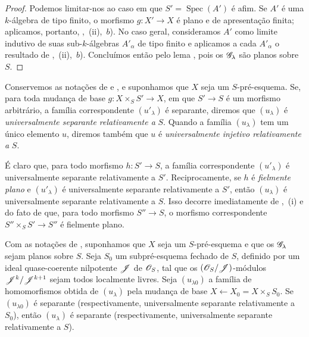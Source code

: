 \begin{proof}
Podemos limitar-nos
ao caso em que
$S'=\operatorname{Spec}(A')$
é afim. Se $A'$ é uma
$k$-álgebra de tipo
finito, o morfismo
$g:X'\to X$ é plano
e de apresentação
finita; aplicamos,
portanto,
,~(ii),~$b$).
No caso geral,
consideramos $A'$
como limite indutivo
de suas sub-$k$-álgebras
$A'_\alpha$ de tipo
finito e aplicamos
a cada $A'_\alpha$
o resultado de
,~(ii),~$b$).
Concluímos então
pelo lema
,
pois os
$\mathscr{G}_\lambda$
são planos sobre $S$.
\end{proof}

\begin{env}[11.9.14]
\label{IV.11.9.14}
Conservemos as
notações de
 e
,
e suponhamos que
$X$ seja um
$S$-pré-esquema.
Se, para toda mudança
de base
$g:X\times_S S'\to X$,
em que $S'\to S$ é
um morfismo
arbitrário, a família
correspondente
$(u'_\lambda)$ é
separante, diremos
que $(u_\lambda)$ é
\emph{universalmente
separante relativamente
a} $S$. Quando a
família $(u_\lambda)$
tem um único elemento
$u$, diremos também
que $u$ é
\emph{universalmente
injetivo relativamente
a} $S$.

É claro que, para
todo morfismo
$h:S'\to S$, a família
correspondente
$(u'_\lambda)$ é
universalmente
separante relativamente
a $S'$. Reciprocamente,
se $h$ é
\emph{fielmente plano}
e $(u'_\lambda)$ é
universalmente
separante relativamente
a $S'$, então
$(u_\lambda)$ é
universalmente
separante relativamente
a $S$. Isso decorre
imediatamente de
,~(i)
e do fato de que,
para todo morfismo
$S''\to S$, o morfismo
correspondente
$S''\times_S S'\to S''$
é fielmente plano.
\end{env}


\begin{proposition}[11.9.15]
\label{IV.11.9.15}
Com as notações de
,
suponhamos que $X$
seja um $S$-pré-esquema
e que os
$\mathscr{G}_\lambda$
sejam planos sobre $S$.
Seja $S_0$ um
subpré-esquema fechado
de $S$, definido por
um ideal quase-coerente
nilpotente $\mathscr{J}$
de $\mathscr{O}_S$, tal que
os
$(\mathscr{O}_S/\mathscr{J})$-módulos
$\mathscr{J}^k/
\mathscr{J}^{k+1}$ sejam
todos localmente
livres. Seja
$(u_{\lambda0})$
a família de
homomorfismos obtida
de $(u_\lambda)$
pela mudança de base
$X\leftarrow X_0=
X\times_S S_0$.
Se $(u_{\lambda0})$
é separante
(respectivamente,
universalmente
separante relativamente
a $S_0$), então
$(u_\lambda)$ é
separante
(respectivamente,
universalmente
separante relativamente
a $S$).
\end{proposition}

